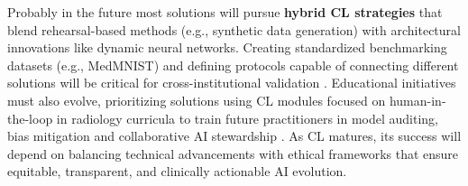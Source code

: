 \documentclass{IEEEcsmag}
\begin{document}
    Probably in the future most solutions will pursue \textbf{hybrid CL strategies} that blend rehearsal-based methods (e.g., synthetic data generation) with architectural innovations like dynamic neural networks\cite{cite-27}\cite{cite-18}.
    Creating standardized benchmarking datasets (e.g., MedMNIST) and defining protocols capable of connecting different solutions will be critical for cross-institutional validation \cite{cite-27}.
    Educational initiatives must also evolve, prioritizing solutions using CL modules focused on human-in-the-loop in radiology curricula to train future practitioners in model auditing, bias mitigation and collaborative AI stewardship \cite{cite-28}\cite{cite-29}.
    As CL matures, its success will depend on balancing technical advancements with ethical frameworks that ensure equitable, transparent, and clinically actionable AI evolution.
    
\end{document}
